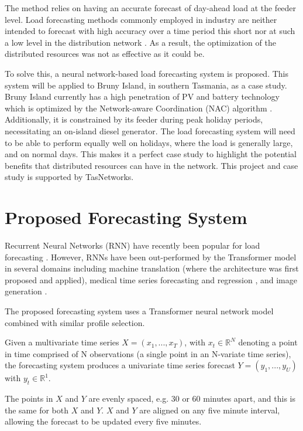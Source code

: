 \documentclass[conference]{IEEEtran}
\begin{document}
The method relies on having an accurate forecast of day-ahead load at the feeder level.
Load forecasting methods commonly employed in industry are neither intended to forecast with high accuracy over a time period this short nor at such a low level in the distribution network \cite{CIGRE2016}.
As a result, the optimization of the distributed resources was not as effective as it could be.
\par
To solve this, a neural network-based load forecasting system is proposed.
This system will be applied to Bruny Island, in southern Tasmania, as a case study.
Bruny Island currently has a high penetration of PV and battery technology which is optimized by the Network-aware Coordination (NAC) algorithm \cite{Evan2016}.
Additionally, it is constrained by its feeder during peak holiday periods, necessitating an on-island diesel generator. The load forecasting system will need to be able to perform equally well on holidays, where the load is generally large, and on normal days. 
This makes it a perfect case study to highlight the potential benefits that distributed resources can have in the network.
This project and case study is supported by TasNetworks.


\section{Proposed Forecasting System}
Recurrent Neural Networks (RNN) have recently been popular for load forecasting \cite{Kong2018}.
However, RNNs have been out-performed by the Transformer \cite{Vaswani2017} model in several domains including machine translation \cite{Vaswani2017} (where the architecture was first proposed and applied), medical time series forecasting and regression \cite{Song2017}, and image generation \cite{Parmar2018}.
\par
The proposed forecasting system uses a Transformer neural network model combined with similar profile selection.
\par
Given a multivariate time series $X = (x_1, ..., x_T)$, with $x_t \in \mathbb{R}^N$ denoting a point in time comprised of N observations (a single point in an N-variate time series), the forecasting system produces a univariate time series forecast $Y = (y_1, ..., y_U)$ with $y_t \in \mathbb{R}^1$.
\par
The points in $X$ and $Y$ are evenly spaced, e.g. 30 or 60 minutes apart, and this is the same for both $X$ and $Y$.
$X$ and $Y$ are aligned on any five minute interval, allowing the forecast to be updated every five minutes.
\end{document}
